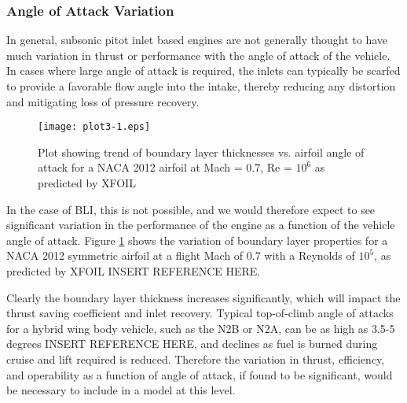			\subsubsection{Angle of Attack Variation}
				In general, subsonic pitot inlet based engines are not generally thought to have much variation in thrust or performance with the angle of attack of the vehicle.  In cases where large angle of attack is required, the inlets can typically be scarfed to provide a favorable flow angle into the intake, thereby reducing any distortion and mitigating loss of pressure recovery.  
				\begin{figure}[htp]
					\centering
					\texttt{[image: plot3-1.eps]}
					\caption{Plot showing trend of boundary layer thicknesses vs. airfoil angle of attack for a NACA 2012 airfoil at Mach = 0.7, Re = $10^6$ as predicted by XFOIL}
					\label{plot3-1}
				\end{figure}
				In the case of BLI, this is not possible, and we would therefore expect to see significant variation in the performance of the engine as a function of the vehicle angle of attack.  Figure \ref{plot3-1} shows the variation of boundary layer properties for a NACA 2012 symmetric airfoil at a flight Mach of 0.7 with a Reynolds of $10^5$, as predicted by XFOIL INSERT REFERENCE HERE.
				
				Clearly the boundary layer thickness increases significantly, which will impact the thrust saving coefficient and inlet recovery.  Typical top-of-climb angle of attacks for a hybrid wing body vehicle, such as the N2B or N2A, can be as high as 3.5-5 degrees INSERT REFERENCE HERE, and declines as fuel is burned during cruise and lift required is reduced.  Therefore the variation in thrust, efficiency, and operability as a function of angle of attack, if found to be significant, would be necessary to include in a model at this level.  
	
